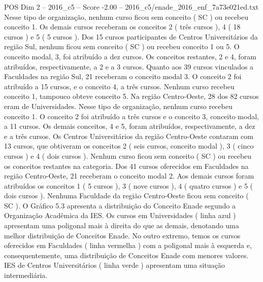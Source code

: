 \begin{textsample}{POS Dim 2 – 2016\_c5 – Score -2.00 – 2016\_c5/enade\_2016\_enf\_7a73e021ed.txt}
Nesse tipo de organização, nenhum curso ficou sem conceito ( SC ) ou recebeu conceito 1.
Os demais cursos receberam os conceitos 2 ( três cursos ), 4 ( 18 cursos ) e 5 ( 5 cursos ).
Dos 15 cursos participantes de Centros Universitários da região Sul, nenhum ficou sem conceito ( SC ) ou recebeu conceito 1 ou 5.
O conceito modal, 3, foi atribuído a dez cursos.
Os conceitos restantes, 2 e 4, foram atribuídos, respectivamente, a 2 e a 3 cursos.
Quanto aos 39 cursos vinculados a Faculdades na região Sul, 21 receberam o conceito modal 3.
O conceito 2 foi atribuído a 15 cursos, e o conceito 4, a três cursos.
Nenhum curso recebeu conceito 1, tampouco obteve conceito 5.
Na região Centro-Oeste, 28 dos 82 cursos eram de Universidades.
Nesse tipo de organização, nenhum curso recebeu conceito 1.
O conceito 2 foi atribuído a três cursos e o conceito 3, conceito modal, a 11 cursos.
Os demais conceitos, 4 e 5, foram atribuídos, respectivamente, a dez e a três cursos.
Os Centros Universitários da região Centro-Oeste contaram com 13 cursos, que obtiveram os conceitos 2 ( seis cursos, conceito modal ), 3 ( cinco cursos ) e 4 ( dois cursos ).
Nenhum curso ficou sem conceito ( SC ) ou recebeu os conceitos restantes na categoria.
Dos 41 cursos oferecidos em Faculdades na região Centro-Oeste, 21 receberam o conceito modal 2.
Aos demais cursos foram atribuídos os conceitos 1 ( 5 cursos ), 3 ( nove cursos ), 4 ( quatro cursos ) e 5 ( dois cursos ).
Nenhuma Faculdade da região Centro-Oeste ficou sem conceito ( SC ).
O Gráfico 5.3 apresenta a distribuição do Conceito Enade segundo a Organização Acadêmica da IES.
Os cursos em Universidades ( linha azul ) apresentam uma poligonal mais à direita do que as demais, denotando uma melhor distribuição de Conceitos Enade.
No outro extremo, temos os cursos oferecidos em Faculdades ( linha vermelha ) com a poligonal mais à esquerda e, consequentemente, uma distribuição de Conceitos Enade com menores valores.
IES de Centros Universitários ( linha verde ) apresentam uma situação intermediária.

\end{textsample}
